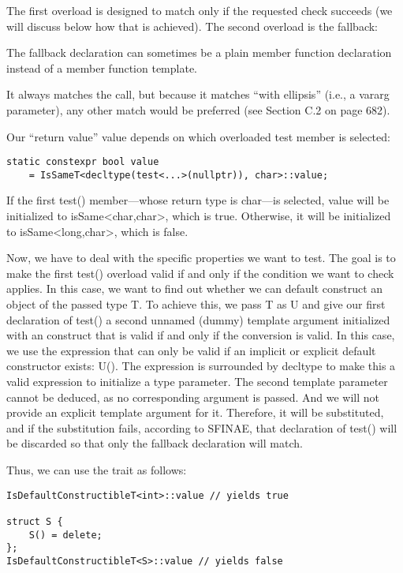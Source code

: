 The first overload is designed to match only if the requested check succeeds (we will discuss below how that is achieved). The second overload is the fallback:

\begin{tcolorbox}[colback=webgreen!5!white,colframe=webgreen!75!black]
\hspace*{0.75cm}The fallback declaration can sometimes be a plain member function declaration instead of a member function template.
\end{tcolorbox}

It always matches the call, but because it matches “with ellipsis” (i.e., a vararg parameter), any other match would be preferred (see Section C.2 on page 682).

Our “return value” value depends on which overloaded test member is selected:

\begin{lstlisting}[style=styleCXX]
static constexpr bool value
	= IsSameT<decltype(test<...>(nullptr)), char>::value;
\end{lstlisting}

If the first test() member—whose return type is char—is selected, value will be initialized to isSame<char,char>, which is true. Otherwise, it will be initialized to isSame<long,char>, which is false.

Now, we have to deal with the specific properties we want to test. The goal is to make the first test() overload valid if and only if the condition we want to check applies. In this case, we want to find out whether we can default construct an object of the passed type T. To achieve this, we pass T as U and give our first declaration of test() a second unnamed (dummy) template argument initialized with an construct that is valid if and only if the conversion is valid. In this case, we use the expression that can only be valid if an implicit or explicit default constructor exists: U(). The expression is surrounded by decltype to make this a valid expression to initialize a type parameter. The second template parameter cannot be deduced, as no corresponding argument is passed. And we will not provide an explicit template argument for it. Therefore, it will be substituted, and if the substitution fails, according to SFINAE, that declaration of test() will be discarded so that only the fallback declaration will match.

Thus, we can use the trait as follows:

\begin{lstlisting}[style=styleCXX]
IsDefaultConstructibleT<int>::value // yields true

struct S {
	S() = delete;
};
IsDefaultConstructibleT<S>::value // yields false
\end{lstlisting}

